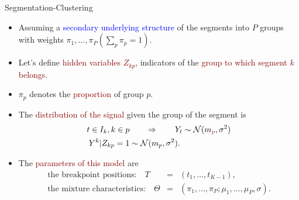 \documentclass{beamer}\usepackage[]{graphicx}\usepackage[]{color}
\newcommand{\emphase}[1]{\textcolor{darkred}{#1}}
\newcommand{\Ncal}{\mathcal{N}}
\begin{document}
\begin{frame}{Segmentation-Clustering}
 \begin{itemize}
 \item Assuming a \textcolor{blue}{secondary underlying
     structure} of the segments into $P$ groups with weights
   $\pi_1,...,\pi_P (\sum_p \pi_p=1)$.
 \item Let's define \emphase{hidden variables $Z_{kp}$}, indicators of the
   \emphase{group to which segment $k$ belongs}.
 \item $\pi_p$ denotes the \emphase{proportion} of group $p$.
 \item The \emphase{distribution of the signal} given the group of the
     segment is
  \begin{align*}
   t \in I_k, k \in p &\qquad \Rightarrow \qquad Y_t \sim
   \Ncal(m_{\emphase{p}}, \sigma^2)\\
   Y^k|Z_{kp}=1 &\sim \Ncal( m_p, \sigma^2 ).
   \end{align*}
 \item The \emphase{parameters of this model} are
   \begin{eqnarray*}
   \mbox{the breakpoint positions:} \quad T&=&(t_1, ..., t_{K-1}),\\
     \mbox{the mixture characteristics:} \quad \Theta&=&(\pi_1,\hdots,\pi_P;\mu_1,\hdots,\mu_P,\sigma).
   \end{eqnarray*}
\end{itemize}
\end{frame} 
\end{document}
